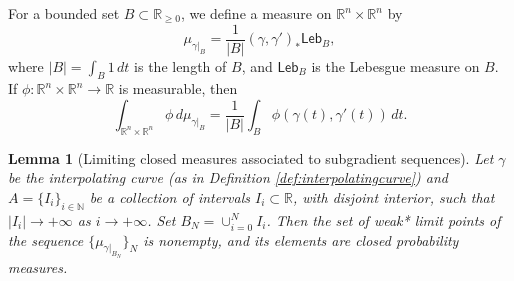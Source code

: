 \documentclass[11pt]{article}
\newtheorem{lem}[thm]{Lemma}
\theoremstyle{definition}
\theoremstyle{remark}
\newcommand{\R}{\mathbb{R}}
\newcommand{\N}{\mathbb{N}}
\newcommand{\lebesgue}{\mathsf{Leb}}
\renewcommand{\geq}{\geqslant}
\newcommand{\meas}[2]{\mu_{#1|_{#2}}}
\begin{document}
\medskip


For a bounded set $B\subset\R_{\geq0}$, we define a measure on $\R^n\times\R^n$ by
\[\meas{\gamma}{B}=\frac{1}{|B|}(\gamma,\gamma')_*\lebesgue_{B},\]
where $|B|=\int_B 1\,dt$ is the length of $B$, and $\lebesgue_B$ is the Lebesgue measure on $B$. 
If $\phi\colon\R^n\times\R^n\to\R$ is measurable, then
\[\int_{\R^n\times\R^n}\phi\,d\meas{\gamma}{B}=\frac1{|B|}\int_B\phi(\gamma(t),\gamma'(t))\,dt.\]

%
\begin{lem}[Limiting closed measures associated to  subgradient sequences]\label{lem:longintervals}
 Let $\gamma$ be the interpolating curve (as in Definition \ref{def:interpolatingcurve}) and $A=\{I_i\}_{i\in\N}$ be a collection of intervals $I_i\subset \R$, with disjoint interior, such that $|I_i|\to+\infty$ as $i\to+\infty$.
 Set $B_N=\cup_{i=0}^NI_i$.
 Then the set of weak* limit points of the sequence $\{\meas{\gamma}{B_N}\}_N$ is nonempty, and its elements are closed probability measures.
 
\end{lem}
\end{document}
